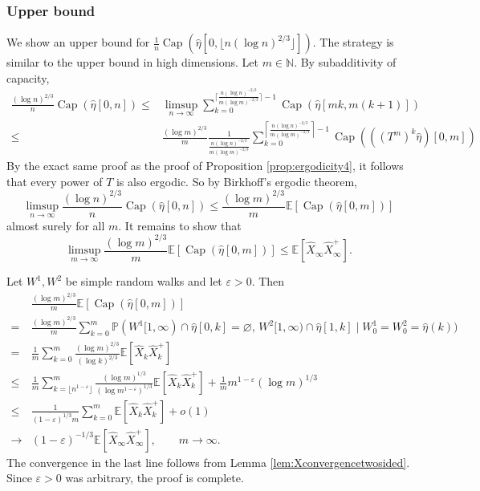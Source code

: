 \documentclass{article}
\DeclareMathOperator{\Ca}{Cap}
\newcommand{\N}{\mathbb{N}}
\renewcommand{\P}{\mathbb{P}}
\newcommand{\E}{\mathbb{E}}
\newcommand{\1}{\mathbf{1}}
\newcommand{\heta}{\hat\eta}
\theoremstyle{definition}
\numberwithin{equation}{section}
\numberwithin{theorem}{section}
\begin{document}
\subsubsection{Upper bound}
We show an upper bound for $\frac{1}{n}\Ca(\heta[0,\lfloor n(\log n)^{2/3}\rfloor])$.
The strategy is similar to the upper bound in high dimensions. Let $m\in\N$. By subadditivity of capacity,
\begin{equation}
	\begin{split}
		\frac{(\log n)^{2/3}}{n}\Ca(\heta[0,n])\leq&\limsup_{n\rightarrow\infty}\sum_{k=0}^{\lceil\frac{n(\log n)^{-2/3}}{m(\log m)^{-2/3}}\rceil-1}\Ca\left(\heta[mk,m(k+1)]\right)\\
		\leq&\frac{(\log m)^{2/3}}{m}\frac{1}{\frac{n(\log n)^{-2/3}}{m(\log m)^{-2/3}}}\sum_{k=0}^{\left\lceil\frac{n(\log n)^{-2/3}}{m(\log m)^{-2/3}}\right\rceil-1}\Ca(((T^m)^k\heta)[0,m])
	\end{split}
\end{equation}
By the exact same proof as the proof of Proposition \ref{prop:ergodicity4}, it follows that every power of $T$ is also ergodic. So by Birkhoff's ergodic theorem,
\begin{equation}
	\limsup_{n\rightarrow\infty}\frac{(\log n)^{2/3}}{n}\Ca(\heta[0,n])\leq\frac{(\log m)^{2/3}}{m}\E[\Ca(\heta[0,m])]
\end{equation}
almost surely for all $m$. It remains to show that
\begin{equation}
    \limsup_{m\rightarrow\infty}\frac{(\log m)^{2/3}}{m}\E[\Ca(\heta[0,m])]\leq\E[\hat X_\infty \hat X^+_\infty].
\end{equation}


Let $W^1,W^2$ be simple random walks and let $\varepsilon>0$. Then
\begin{equation}
    \begin{split}
        &\frac{(\log m)^{2/3}}{m}\E[\Ca(\heta[0,m])]\\
        =&\frac{(\log m)^{2/3}}{m}\sum_{k=0}^m\P(W^1[1,\infty)\cap\heta[0,k]=\varnothing,\,W^2[1,\infty)\cap\heta[1,k]\mid W^1_0=W^2_0=\heta(k))\\
        =&\frac{1}{m}\sum_{k=0}^m\frac{(\log m)^{2/3}}{(\log k)^{2/3}}\E[\hat{X}_{k}\hat{X}_{k}^+]\\
        \leq&\frac{1}{m}\sum_{k=\lfloor n^{1-\varepsilon}\rfloor}^m\frac{(\log m)^{1/3}}{(\log m^{1-\varepsilon})^{1/3}}\E[\hat{X}_{k}\hat{X}_{k}^+] + \frac{1}{m}m^{1-\varepsilon}(\log m)^{1/3}\\
        \leq&\frac{1}{(1-\varepsilon)^{1/3}m}\sum_{k=0}^m\E[\hat{X}_{k}\hat{X}_{k}^+]+o(1)\\
        \rightarrow&(1-\varepsilon)^{-1/3}\E[\hat{X}_{\infty}\hat{X}_{\infty}^+],\qquad m\rightarrow\infty.
    \end{split}
\end{equation}
The convergence in the last line follows from Lemma \ref{lem:Xconvergencetwosided}. Since $\varepsilon>0$ was arbitrary, the proof is complete.
\end{document}
